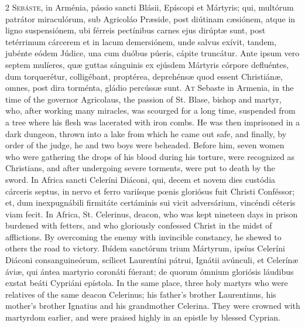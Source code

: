 \begin{paracol}{2}
\lettrine[lines=2]{S}{ebáste,} in Arménia, pássio sancti Blásii, Epíscopi et Mártyris; qui, 
 multórum patrátor miraculórum, sub Agricoláo Præside, 
 post diútinam cæsiónem, atque in ligno suspensiónem, ubi férreis pectínibus 
 carnes ejus dirúptæ sunt, post tetérrimum cárcerem et in lacum demersiónem, 
 unde salvus exívit, tandem, jubénte eódem Júdice, una cum duóbus púeris, 
 cápite truncátur. Ante ipsum vero septem mulíeres, quæ guttas 
 sánguinis ex ejúsdem Mártyris córpore defluéntes, dum torquerétur, 
 colligébant, proptérea, deprehénsæ quod essent Christiánæ, omnes, post dira 
 torménta, gládio percússæ sunt.
\switchcolumn
{}
\lettrine[lines=2]{A}{t} Sebaste in Armenia, in the time of the governor Agricolaus, the passion 
 of St. Blase, bishop and martyr, who, after working many miracles, was 
 scourged for a long time, suspended from a tree where his flesh was 
 lacerated with iron combs. He was then imprisoned in a dark dungeon, 
 thrown into a lake from which he came out safe, and finally, by order of the 
 judge, he and two boys were beheaded. Before him, seven women who were 
 gathering the drops of his blood during his torture, were recognized as 
 Christians, and after undergoing severe torments, were put to death by the 
 sword.
\switchcolumn*
{}
In Africa sancti Celeríni Diáconi, qui, decem et novem dies custódia 
 cárceris septus, in nervo et ferro variísque pœnis 
 gloriósus fuit Christi Conféssor; et, dum inexpugnábili firmitáte certáminis 
 sui vicit adversárium, vincéndi céteris viam fecit.
\switchcolumn
{}
In Africa, St. Celerinus, deacon, who was kept nineteen days in prison 
 burdened with fetters, and who gloriously confessed Christ in the midst of 
 afflictions. By overcoming the enemy with invincible constancy, he 
 shewed to others the road to victory.
\switchcolumn*
{}
Ibídem sanctórum trium Mártyrum, ipsíus Celeríni Diáconi consanguineórum, 
 scílicet Laurentíni pátrui, Ignátii avúnculi, et Celerínæ 
 áviæ, qui ántea martyrio coronáti fúerant; de quorum ómnium gloriósis 
 láudibus exstat beáti Cypriáni epístola.
\switchcolumn
{}
In the same place, three holy martyrs who were relatives of the same deacon 
 Celerinus; his father's brother Laurentinus, his mother's brother Ignatius 
 and his grandmother Celerina. They were crowned with martyrdom 
 earlier, and were praised highly in an epistle by blessed Cyprian.
\switchcolumn*
{}

\end{paracol}
